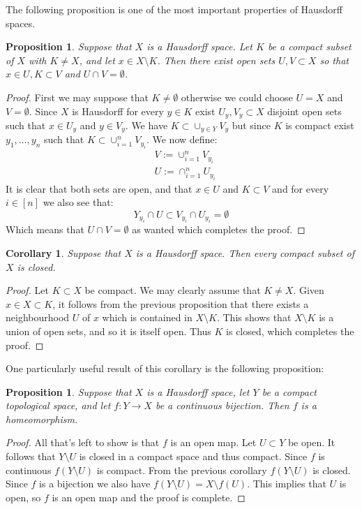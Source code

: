 \documentclass[11pt,a4paper]{article}
\theoremstyle{definition}
\theoremstyle{plain}
\newtheorem{proposition}[theorem]{Proposition}
\newtheorem{corollary}[theorem]{Corollary}
\begin{document}
  The following proposition is one of the most important properties of
  Hausdorff spaces.
  \begin{proposition}
    Suppose that $X$ is a Hausdorff space. Let $K$ be a compact subset
    of $X$ with $K \neq X$, and let $x \in X \setminus K$. Then there 	
    exist open sets $U, V \subset X$ so that $x \in U , K \subset V$ 
    and $U \cap V = \emptyset$.
  \end{proposition}
  \begin{proof}
    First we may suppose that $K \neq \emptyset$ otherwise we could
    choose $U = X$ and $V = \emptyset$. Since $X$ is Hausdorff for
    every $y \in K$ exist $U_y, V_y \subset X$ disjoint open sets 
    such that $x \in U_y$ and $y \in V_y$. We have 
    $K \subset \cup_{y \in Y}{V_y}$ but since $K$ is compact exist
    $y_1,\dots,y_n$ such that $K \subset \cup_{i=1}^{n}{V_{y_i}}$.
    We now define:
    \begin{align*}
      &V := \cup_{i=1}^{n}{V_{y_i}} \\
      &U := \cap_{i=1}^{n}{U_{y_i}}
    \end{align*}
    It is clear that both sets are open, and that $x \in U$ and
    $K \subset V$ and for every $i \in [n]$ we also see that:
    \[
      Y_{y_i} \cap U \subset V_{y_i} \cap U_{y_i} = \emptyset
    \]
    Which means that $U \cap V = \emptyset$ as wanted which completes
    the proof.
  \end{proof}
  \begin{corollary}
    Suppose that $X$ is a Hausdorff space. Then every compact subset
    of $X$ is closed.
  \end{corollary}
  \begin{proof}
    Let $K \subset X$ be compact. We may clearly assume that 
    $K \neq X$. Given $x \in X \subset K$, it follows from the previous
    proposition that there exists a neighbourhood $U$ of $x$ which is 
    contained in $X \setminus K$. This shows that $X \setminus K$ is a 
    union of open sets, and so it is itself open. Thus $K$ is 
    closed, which completes the proof. 
  \end{proof}
  One particularly useful result of this corollary is the following
  proposition:
  \begin{proposition}
    Suppose that $X$ is a Hausdorff space, let $Y$ be a compact 
    topological space, and let $f \colon Y \to X$ be a continuous 
    bijection. Then $f$ is a homeomorphism.
  \end{proposition}
  \begin{proof}
    All that's left to show is that $f$ is an open map. Let $U \subset Y$
    be open. It follows that $Y \setminus U$ is closed in a compact space
    and thus compact. Since $f$ is continuous $f(Y \setminus U)$ is
    compact. From the previous corollary $f(Y \setminus U)$ is closed.
    Since $f$ is a bijection we also have 
    $f(Y \setminus U) = X \setminus f(U)$. This implies that $U$ is open,
    so $f$ is an open map and the proof is complete.
  \end{proof}
\end{document}
